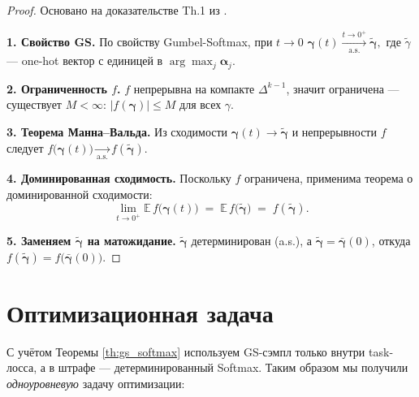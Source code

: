 \documentclass{article}
\begin{document}
\begin{proof} Основано на доказательстве Th.1 из \cite{yakovlev2021neural}.


\textbf{1. Свойство GS.} 
По свойству Gumbel-Softmax\cite{jang2017gumbel,maddison2017concrete}, при $t \rightarrow 0$ 
\(
  \boldsymbol\gamma(t)\xrightarrow[\text{a.s.}]{t\to0^+}\boldsymbol{\tilde\gamma},
\)
где $\tilde\gamma$ — one-hot вектор с единицей в
$\displaystyle\arg\max_{j}\boldsymbol\alpha_j$.

\textbf{2. Ограниченность $f$.}
$f$ непрерывна на компакте $\Delta^{k-1}$, значит ограничена ---
существует $M\!<\infty$: $|f(\boldsymbol\gamma)|\le M$ для всех $\gamma$.

\textbf{3. Теорема Манна–Вальда.}
Из сходимости $\boldsymbol\gamma(t)\!\to\!\boldsymbol{\tilde\gamma}$ и непрерывности $f$ следует
$f\bigl(\boldsymbol\gamma(t)\bigr)\!\xrightarrow[\text{a.s.}]{}f(\boldsymbol{\tilde\gamma})$.

\textbf{4. Доминированная сходимость.}
Поскольку $f$ ограничена, применима теорема о доминированной
сходимости:
$$
   \lim_{t\to0^{+}}
      \mathbb E\,f\bigl(\boldsymbol\gamma(t)\bigr)
   \;=\;
      \mathbb E\,f\bigl(\boldsymbol{\tilde\gamma}\bigr)
   \;=\;
      f(\boldsymbol{\tilde\gamma}).
$$

\textbf{5. Заменяем $\boldsymbol{\tilde\gamma}$ на матожидание.}
$\boldsymbol{\tilde\gamma}$ детерминирован (a.s.), а
$\boldsymbol{\tilde\gamma}=\boldsymbol{\bar\gamma}(0)$, откуда
$
   f(\boldsymbol{\tilde\gamma})=f\bigl(\boldsymbol{\bar\gamma}(0)\bigr).
$
\end{proof}




\section{Оптимизационная задача}

С учётом Теоремы \ref{th:gs_softmax} используем GS-сэмпл только внутри task-лосса, а в штрафе — детерминированный Softmax.
Таким образом мы получили \textit{одноуровневую} задачу оптимизации:
\end{document}
